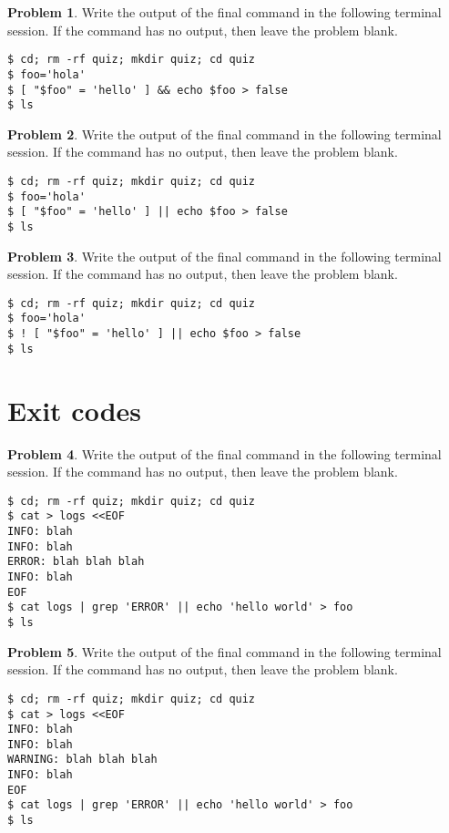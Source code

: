 \documentclass[10pt]{article}
\theoremstyle{definition}
\newtheorem{problem}{Problem}
\begin{document}
\filbreak
\begin{problem}
    Write the output of the final command in the following terminal session.
    If the command has no output, then leave the problem blank.
\end{problem}
\begin{lstlisting}
$ cd; rm -rf quiz; mkdir quiz; cd quiz
$ foo='hola'
$ [ "$foo" = 'hello' ] && echo $foo > false
$ ls
\end{lstlisting}


\filbreak
\begin{problem}
    Write the output of the final command in the following terminal session.
    If the command has no output, then leave the problem blank.
\end{problem}
\begin{lstlisting}
$ cd; rm -rf quiz; mkdir quiz; cd quiz
$ foo='hola'
$ [ "$foo" = 'hello' ] || echo $foo > false
$ ls
\end{lstlisting}

\filbreak
\begin{problem}
    Write the output of the final command in the following terminal session.
    If the command has no output, then leave the problem blank.
\end{problem}
\begin{lstlisting}
$ cd; rm -rf quiz; mkdir quiz; cd quiz
$ foo='hola'
$ ! [ "$foo" = 'hello' ] || echo $foo > false
$ ls
\end{lstlisting}

\section{Exit codes}

\filbreak
\begin{problem}
    Write the output of the final command in the following terminal session.
    If the command has no output, then leave the problem blank.
\end{problem}
\begin{lstlisting}
$ cd; rm -rf quiz; mkdir quiz; cd quiz
$ cat > logs <<EOF
INFO: blah
INFO: blah
ERROR: blah blah blah
INFO: blah
EOF
$ cat logs | grep 'ERROR' || echo 'hello world' > foo
$ ls
\end{lstlisting}

\filbreak
\begin{problem}
    Write the output of the final command in the following terminal session.
    If the command has no output, then leave the problem blank.
\end{problem}
\begin{lstlisting}
$ cd; rm -rf quiz; mkdir quiz; cd quiz
$ cat > logs <<EOF
INFO: blah
INFO: blah
WARNING: blah blah blah
INFO: blah
EOF
$ cat logs | grep 'ERROR' || echo 'hello world' > foo
$ ls
\end{lstlisting}
\end{document}
